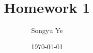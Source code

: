 \documentclass[12pt]{article}  %
\title{Homework 1}
\author{Songyu Ye}
\date{\today}
\begin{document}
\psettitle

\begin{problem}{1}
\end{problem}

\begin{solution}
\end{solution}
\end{document}
